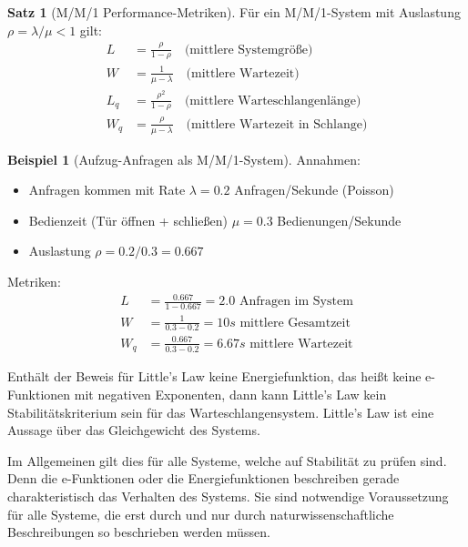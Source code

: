 ﻿\documentclass[a4paper,12pt]{scrreprt}
\theoremstyle{definition}
\newtheorem{beispiel}{Beispiel}[section]
\newtheorem{satz}{Satz}[section]
\begin{document}
\begin{satz}[M/M/1 Performance-Metriken]
	Für ein M/M/1-System mit Auslastung $\rho = \lambda/\mu < 1$ gilt:
	\begin{align}
		L &= \frac{\rho}{1-\rho} \quad \text{(mittlere Systemgröße)} \\
		W &= \frac{1}{\mu - \lambda} \quad \text{(mittlere Wartezeit)} \\
		L_q &= \frac{\rho^2}{1-\rho} \quad \text{(mittlere Warteschlangenlänge)} \\
		W_q &= \frac{\rho}{\mu - \lambda} \quad \text{(mittlere Wartezeit in Schlange)}
	\end{align}
\end{satz}

\begin{beispiel}[Aufzug-Anfragen als M/M/1-System]
	Annahmen:
	\begin{itemize}
		\item[-] Anfragen kommen mit Rate $\lambda = 0.2$ Anfragen/Sekunde (Poisson)
		\item[-] Bedienzeit (Tür öffnen + schließen) $\mu = 0.3$ Bedienungen/Sekunde
		\item[-] Auslastung $\rho = 0.2/0.3 = 0.667$
	\end{itemize}
	
	Metriken:
	\begin{align*}
		L &= \frac{0.667}{1-0.667} = 2.0 \text{ Anfragen im System} \\
		W &= \frac{1}{0.3 - 0.2} = 10s \text{ mittlere Gesamtzeit} \\
		W_q &= \frac{0.667}{0.3 - 0.2} = 6.67s \text{ mittlere Wartezeit}
	\end{align*}
\end{beispiel}

Enthält der Beweis für Little's Law keine Energiefunktion, das heißt keine e-Funktionen mit negativen Exponenten, dann kann Little's Law kein Stabilitätskriterium sein für das Warteschlangensystem. Little's Law ist eine Aussage über das Gleichgewicht des Systems.

Im Allgemeinen gilt dies für alle Systeme, welche auf Stabilität zu prüfen sind. Denn die e-Funktionen oder die Energiefunktionen beschreiben gerade charakteristisch das Verhalten des Systems. Sie sind notwendige Voraussetzung für alle Systeme, die erst durch und nur durch naturwissenschaftliche Beschreibungen so beschrieben werden müssen.
\end{document}
